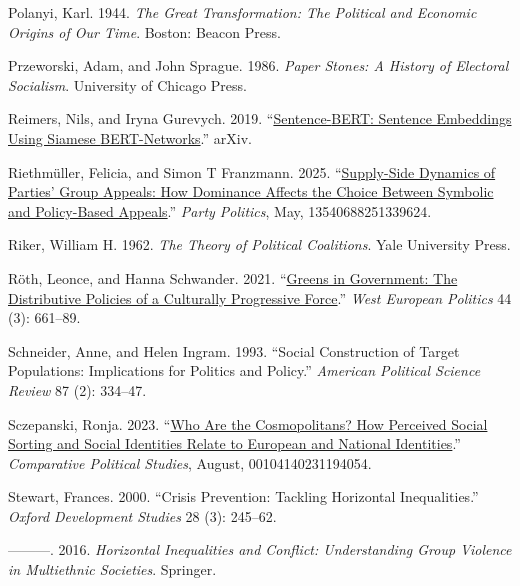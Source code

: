 \documentclass[12pt]{article}
\newlength{\cslhangindent}
\newenvironment{CSLReferences}[2]
  {\begin{list}{}{%
    \setlength{\itemindent}{0pt}
    \setlength{\leftmargin}{0pt}
    \setlength{\parsep}{0pt}
    \ifodd #1
      \setlength{\leftmargin}{\cslhangindent}
      \setlength{\itemindent}{-\cslhangindent}
    \fi
    \setlength{\itemsep}{#2\baselineskip}}}
  {\end{list}}
\begin{document}
\begin{CSLReferences}{1}{0}
Polanyi, Karl. 1944. \emph{The Great Transformation: The Political and Economic Origins of Our Time}. Boston: Beacon Press.

Przeworski, Adam, and John Sprague. 1986. \emph{Paper Stones: A History of Electoral Socialism}. University of Chicago Press.

Reimers, Nils, and Iryna Gurevych. 2019. {``\href{https://doi.org/10.48550/arXiv.1908.10084}{Sentence-{BERT}: Sentence Embeddings Using Siamese {BERT}-Networks}.''} {arXiv}.

Riethmüller, Felicia, and Simon T Franzmann. 2025. {``\href{https://doi.org/10.1177/13540688251339624}{Supply-Side Dynamics of Parties' Group Appeals: How Dominance Affects the Choice Between Symbolic and Policy-Based Appeals}.''} \emph{Party Politics}, May, 13540688251339624.

Riker, William H. 1962. \emph{The Theory of Political Coalitions}. Yale University Press.

Röth, Leonce, and Hanna Schwander. 2021. {``\href{https://doi.org/10.1080/01402382.2019.1702792}{Greens in Government: The Distributive Policies of a Culturally Progressive Force}.''} \emph{West European Politics} 44 (3): 661--89.

Schneider, Anne, and Helen Ingram. 1993. {``Social Construction of Target Populations: Implications for Politics and Policy.''} \emph{American Political Science Review} 87 (2): 334--47.

Sczepanski, Ronja. 2023. {``\href{https://doi.org/10.1177/00104140231194054}{Who Are the Cosmopolitans? How Perceived Social Sorting and Social Identities Relate to European and National Identities}.''} \emph{Comparative Political Studies}, August, 00104140231194054.

Stewart, Frances. 2000. {``Crisis Prevention: Tackling Horizontal Inequalities.''} \emph{Oxford Development Studies} 28 (3): 245--62.

---------. 2016. \emph{Horizontal Inequalities and Conflict: Understanding Group Violence in Multiethnic Societies}. Springer.


\end{CSLReferences}
\end{document}
